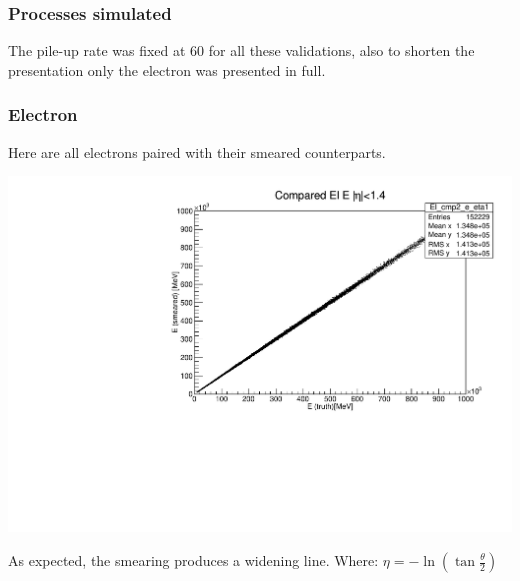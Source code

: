 \documentclass[•]{beamer}
\theoremstyle{remark}
\begin{document}
\begin{frame}\frametitle{Processes simulated}
\begin{block}

The pile-up rate was fixed at 60 for all these validations, also to shorten the presentation only the electron was presented in full. 
\end{block}
\end{frame}
\begin{frame}[shrink=20]\frametitle{Electron}
\begin{block}

Here are all electrons paired with their smeared counterparts.
\end{block}
\includegraphics[scale=0.4]{Figforpres/eleta1plot.pdf}
\begin{block}

As expected, the smearing produces a widening line.
Where: $\eta = - \ln( \tan\frac{\theta}{2})$
\end{block}
\end{frame}
\end{document}
